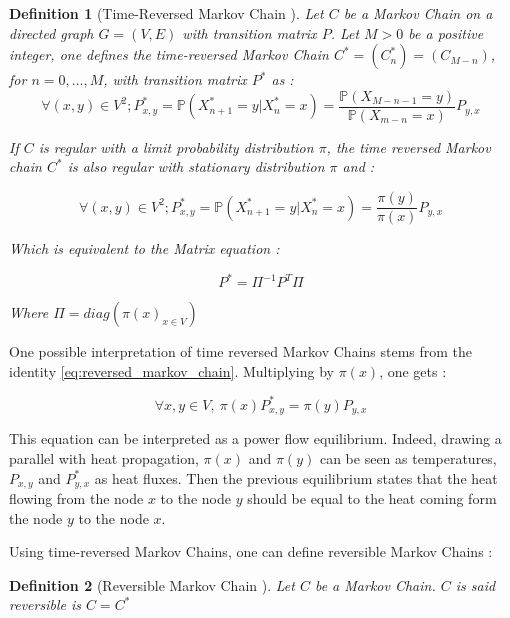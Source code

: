 \documentclass{article}
\newtheorem{definition}{Definition}[section]
\begin{document}
\begin{definition}[Time-Reversed Markov Chain \cite{sevi2019}]\label{def:time_reversed_chain}
Let $C$ be a Markov Chain on a directed graph $G=(V,E)$ with transition matrix $P$. Let $M>0$ be a positive integer, one defines the time-reversed Markov Chain $C^* = (C_n^*) = (C_{M-n})$, for $n = 0, \hdots, M$, with transition matrix $P^*$ as :
\begin{equation}
    \forall (x,y) \in V^2 ; P^*_{x,y} = \mathbb{P}(X^*_{n+1} = y | X^*_n = x) = \frac{\mathbb{P}(X_{M-n-1} = y)}{\mathbb{P}(X_{m-n}=x)} P_{y,x}
\end{equation}

If $C$ is regular with a limit probability distribution $\pi$, the time reversed Markov chain $C^*$ is also regular with stationary distribution $\pi$ and :

\begin{equation} \label{eq:reversed_markov_chain}
    \forall (x,y) \in V^2 ; P^*_{x,y} = \mathbb{P}(X^*_{n+1} = y | X^*_n = x) = \frac{\pi(y)}{\pi(x)} P_{y,x}
\end{equation}

Which is equivalent to the Matrix equation :

\begin{equation}
    P^* = \Pi^{-1} P^T \Pi
\end{equation}

Where $\Pi = diag(\pi(x)_{x\in V})$

\end{definition}

One possible interpretation of time reversed Markov Chains stems from the identity \ref{eq:reversed_markov_chain}. Multiplying by $\pi(x)$, one gets :

\begin{equation}\label{eq:power_equilibrium}
    \forall x,y \in V, \ \pi(x) P^*_{x,y} = \pi(y) P_{y,x}
\end{equation}

This equation can be interpreted as a power flow equilibrium. Indeed, drawing a parallel with heat propagation, $\pi(x)$ and $\pi(y)$ can be seen as temperatures, $P_{x,y}$ and $P^*_{y,x}$ as heat fluxes. Then the previous equilibrium states that the heat flowing from the node $x$ to the node $y$ should be equal to the heat coming form the node $y$ to the node $x$.

Using time-reversed Markov Chains, one can define reversible Markov Chains :

\begin{definition}[Reversible Markov Chain \cite{sevi2019}]
Let $C$ be a Markov Chain. $C$ is said reversible is $C = C^*$
\end{definition}
\end{document}
